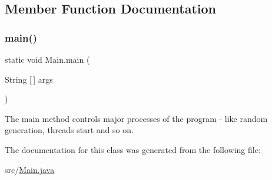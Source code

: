 \subsection{Member Function Documentation}
\mbox{\label{class_main_a8a5d0f827edddff706cc0e6740d0579a}} 
\subsubsection{\texorpdfstring{main()}{main()}}
{\footnotesize\ttfamily static void Main.\+main (\begin{DoxyParamCaption}\item[{String \mbox{[}$\,$\mbox{]}}]{args }\end{DoxyParamCaption})\hspace{0.3cm}{\ttfamily [static]}}

The \textquotesingle{}main\textquotesingle{} method controls major processes of the program -\/ like random generation, threads start and so on. 

The documentation for this class was generated from the following file\+:\begin{DoxyCompactItemize}
\item 
src/\hyperlink{_main_8java}{Main.\+java}\end{DoxyCompactItemize}
